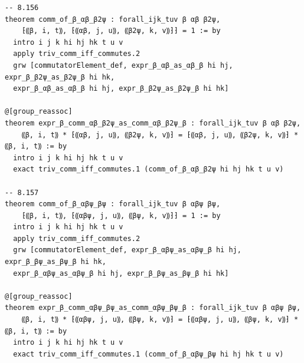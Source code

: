 \documentclass[10pt,a4paper]{article}
\begin{document}
\begin{Verbatim}
-- 8.156
theorem comm_of_β_αβ_β2ψ : forall_ijk_tuv β αβ β2ψ,
    ⁅⸨β, i, t⸩, ⁅⸨αβ, j, u⸩, ⸨β2ψ, k, v⸩⁆⁆ = 1 := by
  intro i j k hi hj hk t u v
  apply triv_comm_iff_commutes.2
  grw [commutatorElement_def, expr_β_αβ_as_αβ_β hi hj, expr_β_β2ψ_as_β2ψ_β hi hk,
  expr_β_αβ_as_αβ_β hi hj, expr_β_β2ψ_as_β2ψ_β hi hk]

@[group_reassoc]
theorem expr_β_comm_αβ_β2ψ_as_comm_αβ_β2ψ_β : forall_ijk_tuv β αβ β2ψ,
    ⸨β, i, t⸩ * ⁅⸨αβ, j, u⸩, ⸨β2ψ, k, v⸩⁆ = ⁅⸨αβ, j, u⸩, ⸨β2ψ, k, v⸩⁆ * ⸨β, i, t⸩ := by
  intro i j k hi hj hk t u v
  exact triv_comm_iff_commutes.1 (comm_of_β_αβ_β2ψ hi hj hk t u v)

-- 8.157
theorem comm_of_β_αβψ_βψ : forall_ijk_tuv β αβψ βψ,
    ⁅⸨β, i, t⸩, ⁅⸨αβψ, j, u⸩, ⸨βψ, k, v⸩⁆⁆ = 1 := by
  intro i j k hi hj hk t u v
  apply triv_comm_iff_commutes.2
  grw [commutatorElement_def, expr_β_αβψ_as_αβψ_β hi hj, expr_β_βψ_as_βψ_β hi hk,
  expr_β_αβψ_as_αβψ_β hi hj, expr_β_βψ_as_βψ_β hi hk]

@[group_reassoc]
theorem expr_β_comm_αβψ_βψ_as_comm_αβψ_βψ_β : forall_ijk_tuv β αβψ βψ,
    ⸨β, i, t⸩ * ⁅⸨αβψ, j, u⸩, ⸨βψ, k, v⸩⁆ = ⁅⸨αβψ, j, u⸩, ⸨βψ, k, v⸩⁆ * ⸨β, i, t⸩ := by
  intro i j k hi hj hk t u v
  exact triv_comm_iff_commutes.1 (comm_of_β_αβψ_βψ hi hj hk t u v)


\end{Verbatim}
\end{document}
